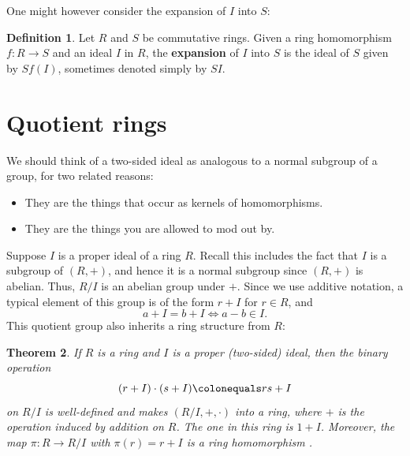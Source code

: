 \documentclass[12pt]{report}
\newtheorem{theorem}{Theorem}[chapter]
\numberwithin{equation}{section}
\numberwithin{theorem}{chapter}
\theoremstyle{definition}
\newtheorem{definition}[theorem]{Definition}
\newtheorem*{basic properties}{Basic Properties}
\newtheorem*{Important Remark}{Important Remark}
\begin{document}
One might however consider the expansion of $I$ into $S$:

\begin{definition}
	Let $R$ and $S$ be commutative rings. Given a ring homomorphism $f\!: R \to S$ and an ideal $I$ in $R$, the {\bf expansion} of $I$ into $S$ is the ideal of $S$ given by $Sf(I)$, sometimes denoted simply by $SI$.
\end{definition}





\section{Quotient rings}

We should think of a two-sided ideal as analogous to a normal subgroup of a group, for two related reasons:
\begin{itemize}[itemsep=-0.1em]
	\item They are the things that occur as kernels of homomorphisms.
	\item They are the things you are allowed to mod out by.
\end{itemize}


Suppose $I$ is a proper ideal of a ring $R$. Recall this includes the fact that $I$ is a subgroup of $(R, +)$, and hence it is a normal subgroup since $(R, +)$ is abelian.
Thus, $R/I$ is an abelian group under $+$. Since we use additive notation, a typical element of this group is of the form $r + I$ for $r \in R$, and
$$a+I = b+I \iff a-b \in I.$$
This quotient group also inherits a ring structure from $R$:

\begin{theorem} 
If $R$ is a ring and $I$ is a proper (two-sided) ideal, then the binary operation 
$$(r + I) \cdot (s +I) \colonequals rs + I$$
on $R/I$ is well-defined and makes $(R/I, +, \cdot)$ into a ring, where $+$ is the operation induced by addition on $R$. The one in this ring is $1+I$.  Moreover, the map $\pi\!: R \to R/I$ with $\pi(r) = r +I$ is a ring homomorphism	.
\end{theorem}
\end{document}
